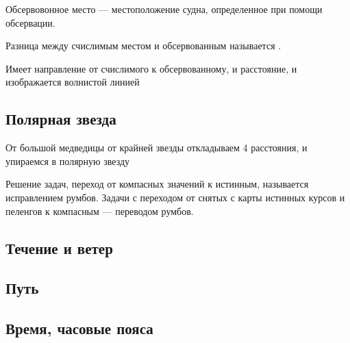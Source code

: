 \documentclass{article}        %
\begin{document}
Обсервовонное место --- местоположение судна, определенное при помощи обсервации.

Разница между счислимым местом и обсервованным называется .

Имеет направление от счислимого к обсервованному, и расстояние, 
и изображается волнистой линией

\subsection{Полярная звезда}
От большой медведицы от крайней звезды откладываем 4 расстояния, и упираемся в полярную звезду

Решение задач, переход от компасных значений к истинным, называется исправлением румбов.
Задачи с переходом от снятых с карты истинных курсов и пеленгов к компасным --- переводом румбов.

\subsection{Течение и ветер}

\subsection{Путь}


\subsection{Время, часовые пояса}
\end{document}
